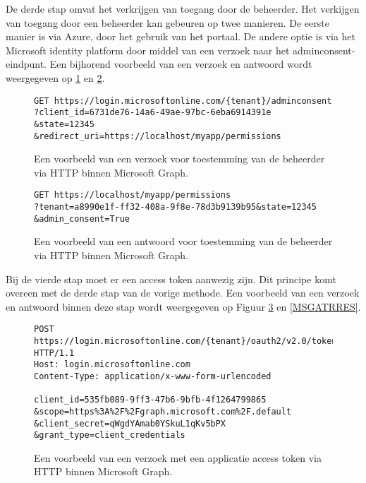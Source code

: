 De derde stap omvat het verkrijgen van toegang door de beheerder. Het verkijgen van toegang door een beheerder kan gebeuren op twee manieren. De eerste manier is via Azure, door het gebruik van het portaal. De andere optie is via het Microsoft identity platform door middel van een verzoek naar het adminconsent-eindpunt. Een bijhorend voorbeeld van een verzoek en antwoord wordt weergegeven op \ref{MSGRAR} en \ref{MSGRARES}. \\

\begin{figure}[!h]
    \scriptsize
    \begin{verbatim}
GET https://login.microsoftonline.com/{tenant}/adminconsent
?client_id=6731de76-14a6-49ae-97bc-6eba6914391e
&state=12345
&redirect_uri=https://localhost/myapp/permissions
    \end{verbatim}    
    \caption[Voorbeeld Adminconsent request Microsoft Graph]{Een voorbeeld van een verzoek voor toestemming van de beheerder via \ac{HTTP} binnen Microsoft Graph.}
    \label{MSGRAR}
\end{figure}

\begin{figure}[!h]
    \scriptsize
    \begin{verbatim}
GET https://localhost/myapp/permissions
?tenant=a8990e1f-ff32-408a-9f8e-78d3b9139b95&state=12345
&admin_consent=True
    \end{verbatim}    
    \caption[Voorbeeld Adminconsent respons Microsoft Graph]{Een voorbeeld van een antwoord voor toestemming van de beheerder via \ac{HTTP} binnen Microsoft Graph.}
    \label{MSGRARES}
\end{figure}

Bij de vierde stap moet er een access token aanwezig zijn. Dit principe komt overeen met de derde stap van de vorige methode. Een voorbeeld van een verzoek en antwoord binnen deze stap wordt weergegeven op Figuur \ref{MSGATRR} en \ref{MSGATRRES}. \\

\begin{figure}[!h]
    \scriptsize
    \begin{verbatim}
POST https://login.microsoftonline.com/{tenant}/oauth2/v2.0/token HTTP/1.1
Host: login.microsoftonline.com
Content-Type: application/x-www-form-urlencoded

client_id=535fb089-9ff3-47b6-9bfb-4f1264799865
&scope=https%3A%2F%2Fgraph.microsoft.com%2F.default
&client_secret=qWgdYAmab0YSkuL1qKv5bPX
&grant_type=client_credentials 
    \end{verbatim}    
    \caption[Voorbeeld Application Token Request Microsoft Graph]{Een voorbeeld van een verzoek met een applicatie access token via \ac{HTTP} binnen Microsoft Graph.}
    \label{MSGATRR}
\end{figure}

